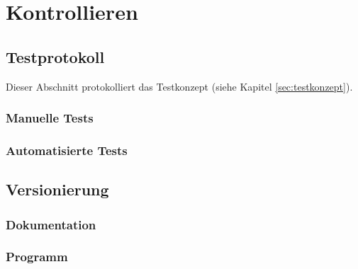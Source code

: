 \chapter{Kontrollieren}

\section{Testprotokoll}
Dieser Abschnitt protokolliert das Testkonzept (siehe Kapitel \ref{sec:testkonzept}).
\subsection{Manuelle Tests}
\label{sec:automated-tests}

\subsection{Automatisierte Tests}
\label{sec:manual-tests}

\section{Versionierung}
\subsection{Dokumentation}
\subsection{Programm}
